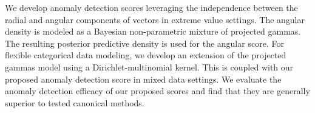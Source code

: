 





We develop anomaly detection scores leveraging the independence between the radial 
    and angular components of vectors in extreme value settings.
    The angular density is modeled as a Bayesian non-parametric mixture of 
    projected gammas.  The resulting posterior predictive density is used
    for the angular score. For flexible categorical data modeling, we develop 
    an extension of  the projected gammas model using a Dirichlet-multinomial 
    kernel. This is coupled with our  proposed anomaly detection  score in 
    mixed data settings. We evaluate  the anomaly detection  efficacy of 
    our proposed scores and find that  they are generally superior to tested 
    canonical methods.    


